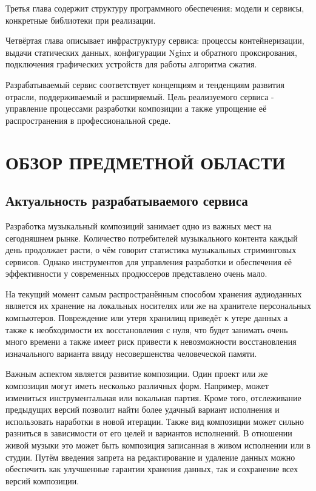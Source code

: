 \documentclass[14pt]{extarticle}
\begin{document}
Третья глава содержит структуру программного обеспечения: модели и сервисы, конкретные библиотеки при 
реализации.

Четвёртая глава описывает инфраструктуру сервиса: процессы контейнеризации, выдачи статических данных, 
конфигурации Nginx и обратного проксирования, подключения графических устройств для работы 
алгоритма сжатия.

Разрабатываемый сервис соответствует концепциям и тенденциям развития отрасли, поддерживаемый 
и расширяемый. Цель реализуемого сервиса - управление процессами разработки 
композиции а также упрощение её распространения в профессиональной среде.

\section{ОБЗОР ПРЕДМЕТНОЙ ОБЛАСТИ}
\subsection{Актуальность разрабатываемого сервиса}

Разработка музыкальный композиций занимает одно из важных мест на сегодняшнем рынке. Количество
потребителей музыкального контента каждый день продолжает расти, о чём говорит статистика
музыкальных стриминговых сервисов. Однако инструментов
для управления разработки и обеспечения её эффективности у современных продюссеров представлено очень мало.

На текущий момент самым распространённым способом хранения аудиоданных является их хранение на локальных
носителях или же на хранителе персональных компьютеров. Повреждение или утеря хранилищ приведёт к
утере данных а также к необходимости их восстановления с нуля, что будет занимать
очень много времени а также имеет риск привести к невозможности восстановления изначального варианта ввиду
несовершенства человеческой памяти.

Важным аспектом является развитие композиции. Один проект или же композиция могут иметь несколько 
различных форм. Например, может измениться инструментальная или вокальная партия. Кроме того, отслеживание предыдущих
версий позволит найти более удачный вариант исполнения и использовать наработки в новой итерации. Также вид композиции 
может сильно разниться в зависимости от его целей и вариантов исполнений. В отношении живой музыки это может быть
композиция записанная в живом исполнении или в студии. Путём введения запрета на редактирование и удаление данных
можно обеспечить как улучшенные гарантии хранения данных, так и сохранение всех версий композиции.
\end{document}
